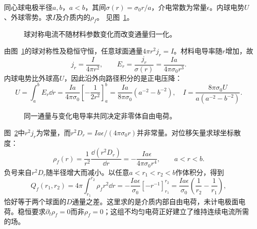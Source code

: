 \begin{exercise}[径向变化的电导率]\label{ex:c1-h2}
同心球电极半径$a,b$，$a<b$，其间$\sigma(r)=\sigma_0r/a$，介电常数为常量$\epsilon$。内球电势$U$、外球零势。求$I$及介质内的$\rho_f$。 见图~\ref{fig:c1-h2-q}。
\end{exercise}

\begin{figure}[H]\centering
{}
\caption{球对称电流不随材料参数变化而改变通量归一化。}\label{fig:c1-h2-q}
\end{figure}
\begin{solution}
由图~\ref{fig:c1-h2-q}的球对称性及稳恒守恒，任意球面通量$4\pi r^2j_r=I$。材料电导率随$r$增加，故
\[
 j_r=\frac I{4\pi r^2},\qquad
 E_r=\frac{j_r}{\sigma(r)}=\frac{Ia}{4\pi\sigma_0r^3}.
\]
内球电势比外球高$U$，因此沿外向路径积分的是正电压降：
\[
 U=\int_a^bE_r\dd r
 =\frac{Ia}{4\pi\sigma_0}\left[-\frac1{2r^2}\right]_a^b
 =\frac{Ia}{8\pi\sigma_0}(a^{-2}-b^{-2}),
 \quad \boxed{I=\frac{8\pi\sigma_0U}{a(a^{-2}-b^{-2})}}.
\]
\begin{figure}[H]\centering
{}
\caption{同一通量与变化电导率共同决定非零体自由电荷。}\label{fig:c1-h2-s}
\end{figure}
图~\ref{fig:c1-h2-s}中$r^2j_r$为常量，而$r^2D_r=Ia\epsilon/(4\pi\sigma_0r)$并非常量。对位移矢量求球坐标散度：
\[
 \boxed{\rho_f(r)=\frac1{r^2}\frac{\dd(r^2D_r)}{\dd r}
 =-\frac{Ia\epsilon}{4\pi\sigma_0r^4}},\qquad a<r<b.
\]
负号来自$r^2D_r$随半径增大而减小。以任意$a<r_1<r_2<b$作体积分，得到
\[
 Q_f(r_1,r_2)=4\pi\int_{r_1}^{r_2}\rho_fr^2\dd r
 =-\frac{Ia\epsilon}{\sigma_0}[-r^{-1}]_{r_1}^{r_2}
 =\frac{Ia\epsilon}{\sigma_0}\left(\frac1{r_2}-\frac1{r_1}\right),
\]
恰好等于两个球面的$D$通量之差。这里求的是介质内部自由电荷，未计电极面电荷。稳恒要求$\partial_t\rho_f=0$而非$\rho_f=0$；这组不均匀电荷正好建立了维持连续电流所需的场。
\end{solution}


